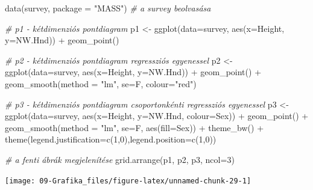 \documentclass[
]{book}
\newenvironment{Shaded}{\begin{snugshade}}{\end{snugshade}}
\newcommand{\AttributeTok}[1]{\textcolor[rgb]{0.77,0.63,0.00}{#1}}
\newcommand{\CommentTok}[1]{\textcolor[rgb]{0.56,0.35,0.01}{\textit{#1}}}
\newcommand{\DecValTok}[1]{\textcolor[rgb]{0.00,0.00,0.81}{#1}}
\newcommand{\FunctionTok}[1]{\textcolor[rgb]{0.00,0.00,0.00}{#1}}
\newcommand{\NormalTok}[1]{#1}
\newcommand{\OtherTok}[1]{\textcolor[rgb]{0.56,0.35,0.01}{#1}}
\newcommand{\SpecialCharTok}[1]{\textcolor[rgb]{0.00,0.00,0.00}{#1}}
\newcommand{\StringTok}[1]{\textcolor[rgb]{0.31,0.60,0.02}{#1}}
\begin{document}
\begin{Shaded}
\begin{Highlighting}[]
\FunctionTok{data}\NormalTok{(survey, }\AttributeTok{package =} \StringTok{"MASS"}\NormalTok{) }\CommentTok{\# a survey beolvasása}

\CommentTok{\# p1 {-} kétdimenziós pontdiagram}
\NormalTok{p1 }\OtherTok{\textless{}{-}} \FunctionTok{ggplot}\NormalTok{(}\AttributeTok{data=}\NormalTok{survey, }\FunctionTok{aes}\NormalTok{(}\AttributeTok{x=}\NormalTok{Height, }\AttributeTok{y=}\NormalTok{NW.Hnd)) }\SpecialCharTok{+} \FunctionTok{geom\_point}\NormalTok{()}

\CommentTok{\# p2 {-} kétdimenziós pontdiagram regressziós egyenessel}
\NormalTok{p2 }\OtherTok{\textless{}{-}} \FunctionTok{ggplot}\NormalTok{(}\AttributeTok{data=}\NormalTok{survey, }\FunctionTok{aes}\NormalTok{(}\AttributeTok{x=}\NormalTok{Height, }\AttributeTok{y=}\NormalTok{NW.Hnd)) }\SpecialCharTok{+} 
        \FunctionTok{geom\_point}\NormalTok{() }\SpecialCharTok{+} \FunctionTok{geom\_smooth}\NormalTok{(}\AttributeTok{method =} \StringTok{"lm"}\NormalTok{, }\AttributeTok{se=}\NormalTok{F, }\AttributeTok{colour=}\StringTok{"red"}\NormalTok{)}

\CommentTok{\# p3 {-} kétdimenziós pontdiagram csoportonkénti regressziós egyenessel}
\NormalTok{p3 }\OtherTok{\textless{}{-}} \FunctionTok{ggplot}\NormalTok{(}\AttributeTok{data=}\NormalTok{survey, }\FunctionTok{aes}\NormalTok{(}\AttributeTok{x=}\NormalTok{Height, }\AttributeTok{y=}\NormalTok{NW.Hnd, }\AttributeTok{colour=}\NormalTok{Sex)) }\SpecialCharTok{+} 
        \FunctionTok{geom\_point}\NormalTok{() }\SpecialCharTok{+} \FunctionTok{geom\_smooth}\NormalTok{(}\AttributeTok{method =} \StringTok{"lm"}\NormalTok{, }\AttributeTok{se=}\NormalTok{F, }\FunctionTok{aes}\NormalTok{(}\AttributeTok{fill=}\NormalTok{Sex)) }\SpecialCharTok{+}
        \FunctionTok{theme\_bw}\NormalTok{() }\SpecialCharTok{+} \FunctionTok{theme}\NormalTok{(}\AttributeTok{legend.justification=}\FunctionTok{c}\NormalTok{(}\DecValTok{1}\NormalTok{,}\DecValTok{0}\NormalTok{),}\AttributeTok{legend.position=}\FunctionTok{c}\NormalTok{(}\DecValTok{1}\NormalTok{,}\DecValTok{0}\NormalTok{))  }

\CommentTok{\# a fenti ábrák megjelenítése}
\FunctionTok{grid.arrange}\NormalTok{(p1, p2, p3, }\AttributeTok{ncol=}\DecValTok{3}\NormalTok{)}
\end{Highlighting}
\end{Shaded}

\begin{center}\texttt{[image: 09-Grafika\_files/figure-latex/unnamed-chunk-29-1]} \end{center}
\end{document}
